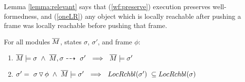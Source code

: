  
 
Lemma  \ref{lemma:relevant} %
says that 
(\ref{wf:preserve}) execution preserves well-formedness, and 
(\ref{oneLR}) any object which is locally reachable after pushing a frame was locally reachable before pushing that frame.
 
\begin{lemma}
\label{lemma:relevant}
\label{l:wf:state}
\label{lemma:push:N}
For all modules $\overline{M}$, states $\sigma$, $\sigma'$,   and frame $\phi$:
\begin{enumerate}
\item
\label{wf:preserve}
$\overline{M} \models \sigma \ \wedge \ {\overline{M}, \sigma \dashrightarrow\ \sigma'}  \ \    \Longrightarrow \ \ \overline{M} \models \sigma' $
\item
\label{oneLR}
{$ \sigma'= \PushSF {\phi} {\sigma}   \ \wedge  \   \Mtwo \models \sigma' %
 \ \  \Longrightarrow\ \ \LRelevantO {\sigma'}\  \subseteq \LRelevantO   {\sigma}$}

\end{enumerate}
\end{lemma}

 
 
  
  
  
  

